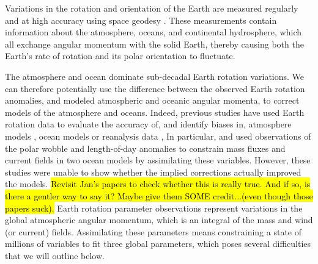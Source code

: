 
Variations in the rotation and orientation of the Earth are measured regularly and at high accuracy using space geodesy \citep{Gross1992,iers}. 
These measurements contain information about the atmosphere, oceans, and continental hydrosphere, which all exchange angular momentum with the solid Earth, thereby causing both the Earth's rate of rotation and its polar orientation to fluctuate. 

The atmosphere and ocean dominate sub-decadal Earth rotation variations. 
We can therefore potentially use the difference between the observed Earth rotation anomalies, and modeled atmospheric and oceanic angular momenta, to correct models of the atmosphere and oceans. 
Indeed, previous studies have used Earth rotation data to evaluate the accuracy of, 
and identify biases in, atmosphere models \citep{Boer1990, Rosen2000}, ocean 
models \citep{Gross1996a} or reanalysis data \citep{Yu1999, Aoyama2000, 
Paek2012a},
In particular, \citet{Saynisch2010,Saynisch2011} and \citet{Saynisch2012} used observations of the polar wobble and length-of-day anomalies to constrain mass fluxes and current fields in two ocean models by assimilating these variables.
However, these studies were unable to show whether the implied corrections actually improved the models. 
\hl{Revisit Jan's papers to check whether this is really true. And if so, is there a gentler way to say it? Maybe give them SOME credit...(even though those papers suck).}
Earth rotation parameter observations represent variations in the global atmospheric angular momentum, which is an integral of the mass and wind (or current) fields. 
Assimilating these parameters means constraining a state of millions of variables to fit three global parameters, which poses several difficulties that we will outline below.  

